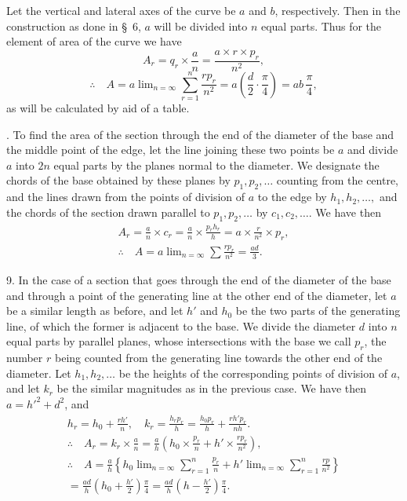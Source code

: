 \documentclass[11pt]{article}
\newcommand{\scanpage}[2]{\clearpage\setcounter{footnote}{0}\noindent{\footnotesize\color{gray}PDF page #1 · #2}\par\medskip}
\begin{document}
Let the vertical and lateral axes of the curve be $a$ and $b$, respectively. Then in the construction as done in \S~6, $a$ will be divided into $n$ equal parts. Thus for the element of area of the curve we have
\[
A_r = q_r\times\frac{a}{n} = \frac{a\times r\times p_r}{n^2},
\]
\[
\therefore\quad A = a\lim\nolimits_{n=\infty}\sum_{r=1}^{n}\frac{rp_r}{n^2} = a\left(\frac{d}{2}\cdot\frac{\pi}{4}\right) = ab\,\frac{\pi}{4},
\]
as will be calculated by aid of a table.

\scanpage{0302}{printed page 288}
8. To find the area of the section through the end of the diameter of the base and the middle point of the edge, let the line joining these two points be $a$ and divide $a$ into $2n$ equal parts by the planes normal to the diameter. We designate the chords of the base obtained by these planes by $p_1, p_2, \ldots$ counting from the centre, and the lines drawn from the points of division of $a$ to the edge by $h_1, h_2, \ldots,$ and the chords of the section drawn parallel to $p_1, p_2, \ldots$ by $c_1, c_2, \ldots$. We have then
\begin{gather*}
A_r = \frac{a}{n} \times c_r = \frac{a}{n} \times \frac{p_r h_r}{h} = a \times \frac{r}{n^2} \times p_r,\\
\therefore\quad A = a \lim\nolimits_{n=\infty} \sum \frac{rp_r}{n^2} = \frac{ad}{3}.
\end{gather*}

9. In the case of a section that goes through the end of the diameter of the base and through a point of the generating line at the other end of the diameter, let $a$ be a similar length as before, and let $h'$ and $h_0$ be the two parts of the generating line, of which the former is adjacent to the base. We divide the diameter $d$ into $n$ equal parts by parallel planes, whose intersections with the base we call $p_r$, the number $r$ being counted from the generating line towards the other end of the diameter. Let $h_1, h_2, \ldots$ be the heights of the corresponding points of division of $a$, and let $k_r$ be the similar magnitudes as in the previous case. We have then $a = h'^2 + d^2$, and
\begin{gather*}
h_r = h_0 + \frac{rh'}{n}, \quad k_r = \frac{h_r p_r}{h} = \frac{h_0 p_r}{h} + \frac{rh' p_r}{nh}.\\
\therefore\quad A_r = k_r \times \frac{a}{n} = \frac{a}{h}\left(h_0 \times \frac{p_r}{n} + h' \times \frac{rp_r}{n^2}\right),\\
\therefore\quad A = \frac{a}{h}\left\{h_0 \lim\nolimits_{n=\infty} \sum_{r=1}^{n} \frac{p_r}{n} + h' \lim\nolimits_{n=\infty} \sum_{r=1}^{n} \frac{rp}{n^2}\right\}\\
= \frac{ad}{h}\left(h_0 + \frac{h'}{2}\right)\frac{\pi}{4} = \frac{ad}{h}\left(h - \frac{h'}{2}\right)\frac{\pi}{4}.
\end{gather*}
\end{document}
